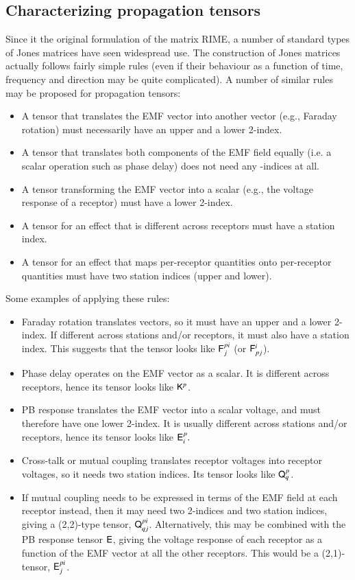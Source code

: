 \documentclass[]{aa}
\begin{document}
\subsection{Characterizing propagation tensors}

Since it the original formulation of the matrix RIME, a number of standard types of Jones matrices have seen widespread use.
The construction of Jones matrices actually follows fairly simple rules (even if their behaviour as a function of time, frequency and direction may be quite complicated). A number of similar rules may be proposed for propagation tensors:

\begin{itemize}
\item A tensor that translates the EMF vector into another vector (e.g., Faraday rotation) must necessarily have an upper and a lower
2-index. 
\item A tensor that translates both components of the EMF field equally (i.e. a scalar operation such as phase delay) does not need any 
-indices at all.
\item A tensor transforming the EMF vector into a scalar (e.g., the voltage response of a receptor) must have a lower 2-index.
\item A tensor for an effect that is different across receptors must have a station index.
\item A tensor for an effect that maps per-receptor quantities onto per-receptor quantities must
have two station indices (upper and lower).
\end{itemize}

Some examples of applying these rules:

\begin{itemize}
\item Faraday rotation translates vectors, so it must have an upper and
a lower 2-index. If different across stations and/or receptors, it must also
have a station index. This suggests that the tensor looks like $\mathsf{F}_{j}^{pi}$ (or $\mathsf{F}_{pj}^{i}$).

\item Phase delay operates on the EMF vector as a scalar. It is different
across receptors, hence its tensor looks like $\mathsf{K}^{p}$.
\item PB response translates the EMF vector into a scalar voltage, and
must therefore have one lower 2-index. It is usually different across stations and/or receptors, hence its tensor looks 
like $\mathsf{E}_{i}^{p}.$
\item Cross-talk or mutual coupling translates receptor voltages into receptor voltages, so it needs two station indices. Its tensor looks
like $\mathsf{Q}_{q}^{p}$.
\item If mutual coupling needs to be expressed in terms of the EMF field at each receptor instead,
then it may need two 2-indices and two station indices, giving a (2,2)-type tensor, $\mathsf{Q}_{qj}^{pi}$.
Alternatively, this may be combined with the PB response tensor $\mathsf{E}$, giving the voltage response of each receptor as
a function of the EMF vector at all the other receptors. This would be a (2,1)-tensor, $\mathsf{E}_{j}^{pi}$.
\end{itemize}
\end{document}
